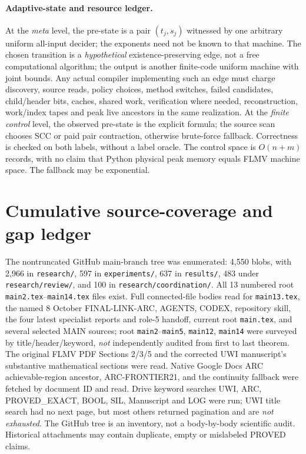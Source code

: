 \documentclass[11pt]{article}
\begin{document}
\paragraph{Adaptive-state and resource ledger.}
At the \emph{meta} level, the pre-state is a pair $(t_j,s_j)$ witnessed by one arbitrary uniform all-input decider; the exponents need not be known to that machine. The chosen transition is a \emph{hypothetical} existence-preserving edge, not a free computational algorithm; the output is another finite-code uniform machine with joint bounds. Any actual compiler implementing such an edge must charge discovery, source reads, policy choices, method switches, failed candidates, child/header bits, caches, shared work, verification where needed, reconstruction, work/index tapes and peak live ancestors in the same realization. At the \emph{finite control} level, the observed pre-state is the explicit formula; the source scan chooses SCC or paid pair contraction, otherwise brute-force fallback. Correctness is checked on both labels, without a label oracle. The control space is $O(n+m)$ records, with no claim that Python physical peak memory equals FLMV machine space. The fallback may be exponential.

\section{Cumulative source-coverage and gap ledger}
The nontruncated GitHub main-branch tree was enumerated: 4,550 blobs, with 2,966 in \texttt{research/}, 597 in \texttt{experiments/}, 637 in \texttt{results/}, 483 under \texttt{research/review/}, and 100 in \texttt{research/coordination/}. All 13 numbered root \texttt{main2.tex}--\texttt{main14.tex} files exist. Full connected-file bodies read for \texttt{main13.tex}, the named 8 October FINAL-LINK-ARC, AGENTS, CODEX, repository skill, the four latest specialist reports and role-5 handoff, current root \texttt{main.tex}, and several selected MAIN sources; root \texttt{main2}--\texttt{main5}, \texttt{main12}, \texttt{main14} were surveyed by title/header/keyword, \emph{not} independently audited from first to last theorem. The original FLMV PDF Sections 2/3/5 and the corrected UWI manuscript's substantive mathematical sections were read. Native Google Docs ARC achievable-region ancestor, ARC-FRONTIER21, and the continuity fallback were fetched by document ID and read. Drive keyword searches UWI, ARC, PROVED\_EXACT, BOOL, SIL, Manuscript and LOG were run; UWI title search had no next page, but most others returned pagination and are \emph{not exhausted}. The GitHub tree is an inventory, not a body-by-body scientific audit. Historical attachments may contain duplicate, empty or mislabeled PROVED claims.
\end{document}
